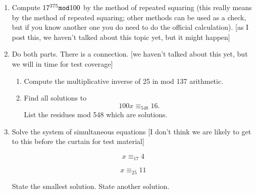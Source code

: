 \documentclass[12pt]{article}
\begin{document}
\begin{enumerate}
\newpage

\item   Compute $17^{375} {\tt mod} 100$ by the method of repeated squaring (this really means by the method of repeated squaring;  other methods can be used as a check, but if you know another one you do need to do the official calculation).  [as I post this, we haven't talked about this topic yet, but it might happen]



\newpage

\item Do both parts.  There is a connection. [we haven't talked about this yet, but we will in time for test coverage]
\begin{enumerate}

\item  Compute the multiplicative inverse of 25 in mod 137 arithmetic.



\item  Find all solutions to $$100x \equiv_{548} 16.$$  List the residues mod 548 which are solutions.



\end{enumerate}

\newpage

\item  Solve the system of simultaneous equations [I don't think we are likely to get to this before the curtain for test material]

$$x \equiv_{17} 4$$

$$x \equiv_{25}  11$$

State the smallest solution.  State another solution.




\newpage

\end{enumerate}
\end{document}
